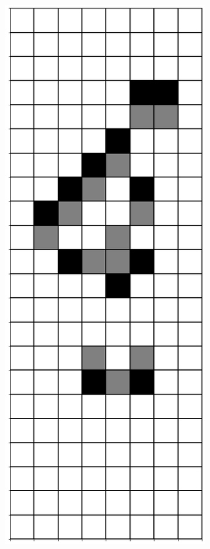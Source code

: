\documentclass[12pt]{article}
\numberwithin{figure}{section} %
\begin{document}
\begin{figure}[H]
\begin{subfigure}{0.18\textwidth}
     		\subcaption{}
   	\end{subfigure}
        \begin{subfigure}{0.18\textwidth}
     		\centering
     		\includegraphics[width=\linewidth]{Section4/20.2}

\end{subfigure}
\end{figure}
\end{document}
